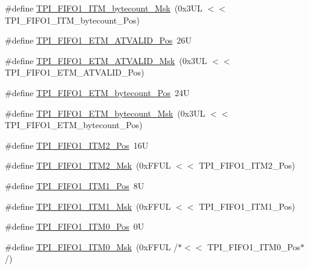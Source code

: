 \begin{DoxyCompactItemize}
\item 
\#define \mbox{\hyperlink{group___c_m_s_i_s___t_p_i_gacba2edfc0499828019550141356b0dcb}{T\+P\+I\+\_\+\+F\+I\+F\+O1\+\_\+\+I\+T\+M\+\_\+bytecount\+\_\+\+Msk}}~(0x3\+U\+L $<$$<$ T\+P\+I\+\_\+\+F\+I\+F\+O1\+\_\+\+I\+T\+M\+\_\+bytecount\+\_\+\+Pos)
\item 
\#define \mbox{\hyperlink{group___c_m_s_i_s___t_p_i_ga3177b8d815cf4a707a2d3d3d5499315d}{T\+P\+I\+\_\+\+F\+I\+F\+O1\+\_\+\+E\+T\+M\+\_\+\+A\+T\+V\+A\+L\+I\+D\+\_\+\+Pos}}~26U
\item 
\#define \mbox{\hyperlink{group___c_m_s_i_s___t_p_i_ga0e8f29a1e9378d1ceb0708035edbb86d}{T\+P\+I\+\_\+\+F\+I\+F\+O1\+\_\+\+E\+T\+M\+\_\+\+A\+T\+V\+A\+L\+I\+D\+\_\+\+Msk}}~(0x3\+U\+L $<$$<$ T\+P\+I\+\_\+\+F\+I\+F\+O1\+\_\+\+E\+T\+M\+\_\+\+A\+T\+V\+A\+L\+I\+D\+\_\+\+Pos)
\item 
\#define \mbox{\hyperlink{group___c_m_s_i_s___t_p_i_gaab31238152b5691af633a7475eaf1f06}{T\+P\+I\+\_\+\+F\+I\+F\+O1\+\_\+\+E\+T\+M\+\_\+bytecount\+\_\+\+Pos}}~24U
\item 
\#define \mbox{\hyperlink{group___c_m_s_i_s___t_p_i_gab554305459953b80554fdb1908b73291}{T\+P\+I\+\_\+\+F\+I\+F\+O1\+\_\+\+E\+T\+M\+\_\+bytecount\+\_\+\+Msk}}~(0x3\+U\+L $<$$<$ T\+P\+I\+\_\+\+F\+I\+F\+O1\+\_\+\+E\+T\+M\+\_\+bytecount\+\_\+\+Pos)
\item 
\#define \mbox{\hyperlink{group___c_m_s_i_s___t_p_i_ga1828c228f3940005f48fb8dd88ada35b}{T\+P\+I\+\_\+\+F\+I\+F\+O1\+\_\+\+I\+T\+M2\+\_\+\+Pos}}~16U
\item 
\#define \mbox{\hyperlink{group___c_m_s_i_s___t_p_i_gae54512f926ebc00f2e056232aa21d335}{T\+P\+I\+\_\+\+F\+I\+F\+O1\+\_\+\+I\+T\+M2\+\_\+\+Msk}}~(0x\+F\+F\+U\+L $<$$<$ T\+P\+I\+\_\+\+F\+I\+F\+O1\+\_\+\+I\+T\+M2\+\_\+\+Pos)
\item 
\#define \mbox{\hyperlink{group___c_m_s_i_s___t_p_i_gaece86ab513bc3d0e0a9dbd82258af49f}{T\+P\+I\+\_\+\+F\+I\+F\+O1\+\_\+\+I\+T\+M1\+\_\+\+Pos}}~8U
\item 
\#define \mbox{\hyperlink{group___c_m_s_i_s___t_p_i_ga3347f42828920dfe56e3130ad319a9e6}{T\+P\+I\+\_\+\+F\+I\+F\+O1\+\_\+\+I\+T\+M1\+\_\+\+Msk}}~(0x\+F\+F\+U\+L $<$$<$ T\+P\+I\+\_\+\+F\+I\+F\+O1\+\_\+\+I\+T\+M1\+\_\+\+Pos)
\item 
\#define \mbox{\hyperlink{group___c_m_s_i_s___t_p_i_ga2188671488417a52abb075bcd4d73440}{T\+P\+I\+\_\+\+F\+I\+F\+O1\+\_\+\+I\+T\+M0\+\_\+\+Pos}}~0U
\item 
\#define \mbox{\hyperlink{group___c_m_s_i_s___t_p_i_ga8ae09f544fc1a428797e2a150f14a4c9}{T\+P\+I\+\_\+\+F\+I\+F\+O1\+\_\+\+I\+T\+M0\+\_\+\+Msk}}~(0x\+F\+F\+U\+L /$\ast$$<$$<$ T\+P\+I\+\_\+\+F\+I\+F\+O1\+\_\+\+I\+T\+M0\+\_\+\+Pos$\ast$/)
$$
\end{DoxyCompactItemize}
